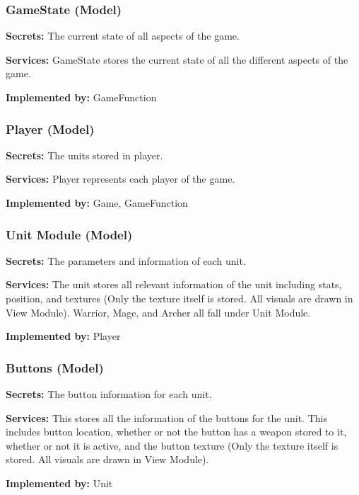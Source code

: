 \documentclass{article}
\begin{document}
\subsubsection{GameState (Model)}
\begin{description}[leftmargin=0.2cm]
    \item \textbf{Secrets:} The current state of all aspects of the game.
    \item \textbf{Services:} GameState stores the current state of all the different aspects of the game.
    \item \textbf{Implemented by:} GameFunction
\end{description}

\subsubsection{Player (Model)}
\begin{description}[leftmargin=0.2cm]
    \item \textbf{Secrets:} The units stored in player.
    \item \textbf{Services:} Player represents each player of the game.
    \item \textbf{Implemented by:} Game, GameFunction
\end{description}

\subsubsection{Unit Module (Model)}
\begin{description}[leftmargin=0.2cm]
    \item \textbf{Secrets:} The parameters and information of each unit.
    \item \textbf{Services:} The unit stores all relevant information of the unit including stats, position, and textures (Only the texture itself is stored. All visuals are drawn in View Module). Warrior, Mage, and Archer all fall under Unit Module.
    \item \textbf{Implemented by:} Player
\end{description}

\subsubsection{Buttons (Model)}
\begin{description}[leftmargin=0.2cm]
    \item \textbf{Secrets:} The button information for each unit.
    \item \textbf{Services:} This stores all the information of the buttons for the unit. This includes button location, whether or not the button has a weapon stored to it, whether or not it is active, and the button texture (Only the texture itself is stored. All visuals are drawn in View Module).
    \item \textbf{Implemented by:} Unit
\end{description}
\end{document}
